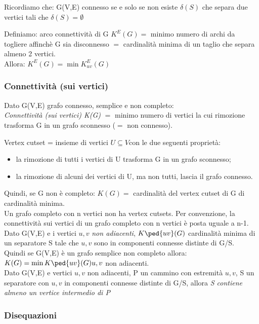 \medskip
\noindent
Ricordiamo che: G(V,E) connesso se e solo se non esiste \( \delta(S)\) che separa due vertici tali che \( \delta(S) = \emptyset \) 

\medskip
\noindent
Definiamo: arco connettività di G $K^E(G) =$ minimo numero di archi da togliere affinchè G sia disconnesso $=$ cardinalità minima di un taglio che separa almeno 2 vertici. \\
Allora: \( K^E(G) = \min K^E_{uv} (G)\)

\subsubsection{Connettività (sui vertici)}

Dato G(V,E) grafo connesso, semplice e non completo: \\
\emph{Connettività (sui vertici) K(G)} $=$ minimo numero di vertici la cui rimozione trasforma G in un grafo
sconnesso ($=$ non connesso).

\medskip
Vertex cutset = insieme di vertici $U \subseteq V $con le due seguenti proprietà:
\begin{itemize}
\item la rimozione di tutti i vertici di U trasforma G in un grafo sconnesso;
\item la rimozione di alcuni dei vertici di U, ma non tutti, lascia il grafo connesso.
\end{itemize}

\noindent
Quindi, se G non è completo: \(K(G) = \) cardinalità del vertex cutset di G di cardinalità minima.\\
Un grafo completo con n vertici non ha vertex cutsets.
Per convenzione, la connettività sui vertici di un grafo completo con n vertici è posta uguale a n-1.\\

\noindent
Dato G(V,E) e i vertici $u,v$ \emph{non adiacenti}, \(K\ped{uv}(G)\) cardinalità minima di un separatore S tale che $u,v$ sono in componenti connesse distinte di G/S. \\
Quindi se G(V,E) è un grafo semplice non completo allora: \(K(G)= \min K\ped{uv}(G) u,v\) non adiacenti. \\
Dato G(V,E) e vertici $u,v$ non adiacenti, P un cammino con estremità $u,v$, S un separatore con $u,v$ in componenti connesse distinte di G/S, allora \emph{S contiene almeno un vertice intermedio di P}\\

\subsubsection{Disequazioni}
